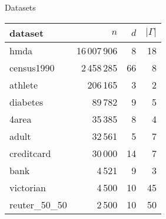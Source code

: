 \documentclass{beamer}
\begin{document}
\begin{frame}{Datasets}
\begin{table}
  \smaller
	\begin{tabular}[t]{lrrr}
		\toprule
		dataset        & $n$            & $d$ & $|\Gamma|$ \\
		\midrule
		hmda           & 16\,007\,906 & 8          & 18         \\
		census1990     & 2\,458\,285  & 66         & 8          \\
		athlete        & 206\,165     & 3          & 2          \\
		diabetes       & 89\,782      & 9          & 5          \\
		4area          & 35\,385      & 8          & 4          \\
		adult          & 32\,561      & 5          & 7          \\
		creditcard     & 30\,000      & 14         & 7          \\
		bank           & 4\,521       & 9          & 3          \\
		victorian      & 4\,500       & 10         & 45         \\
		reuter\_50\_50 & 2\,500       & 10         & 50         \\
		\bottomrule
	\end{tabular}
\end{table}
\end{frame}
\end{document}
